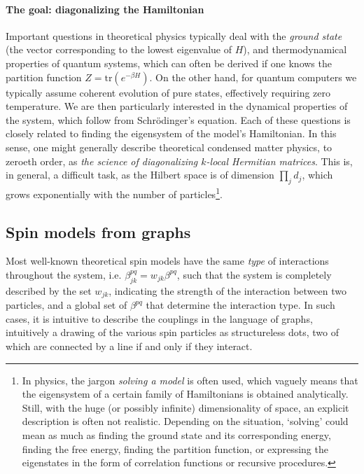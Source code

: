 \paragraph{The goal: diagonalizing the Hamiltonian}
Important questions in theoretical physics typically deal with the \emph{ground state} (the vector corresponding to the lowest eigenvalue of $H$), and thermodynamical properties of quantum systems, which can often be derived if one knows the partition function $Z = \text{tr}( e^{-\beta H} )$. On the other hand, for quantum computers we typically assume coherent evolution of pure states, effectively requiring zero temperature. We are then particularly interested in the dynamical properties of the system, which follow from Schr\"{o}dinger's equation. Each of these questions is closely related to finding the eigensystem of the model's Hamiltonian. In this sense, one might generally describe theoretical condensed matter physics, to zeroeth order, as \emph{the science of diagonalizing $k$-local Hermitian matrices}. This is, in general, a difficult task, as the Hilbert space is of dimension $\prod_j d_j$, which grows exponentially with the number of particles\footnote{In physics, the jargon \emph{solving a model} is often used, which vaguely means that the eigensystem of a certain family of Hamiltonians is obtained analytically. Still, with the huge (or possibly infinite) dimensionality of space, an explicit description is often not realistic. Depending on the situation, `solving' could mean as much as finding the ground state and its corresponding energy, finding the free energy, finding the partition function, or expressing the eigenstates in the form of correlation functions or recursive procedures. }.


\subsection{Spin models from graphs}
\label{sec:graphs}
Most well-known theoretical spin models have the same \emph{type} of interactions throughout the system, i.e. $\beta^{pq}_{jk} = w_{jk} \beta^{pq}$, such that the system is completely described by the set $w_{jk}$, indicating the strength of the interaction between two particles, and a global set of $\beta^{pq}$ that determine the interaction type. In such cases, it is intuitive to describe the couplings in the language of graphs, intuitively a drawing of the various spin particles as structureless dots, two of which are connected by a line if and only if they interact. 

